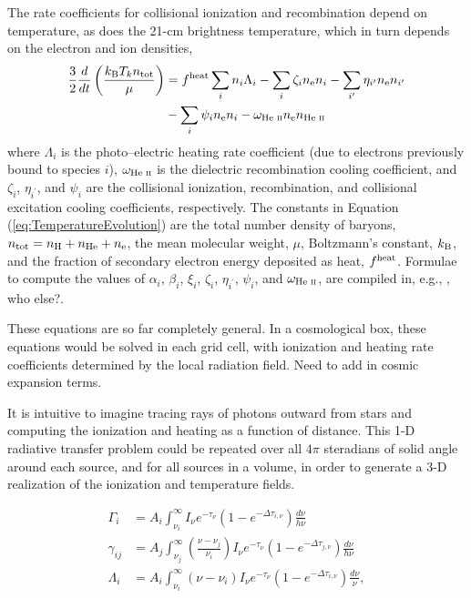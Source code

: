 The rate coefficients for collisional ionization and recombination depend on temperature, as does the 21-cm brightness temperature, which in turn depends on the electron and ion densities, 
\begin{align}
    \frac{3}{2}\frac{d}{dt}\left(\frac{k_{\text{B}} T_k n_{\text{tot}}}{\mu}\right) & = f^{\text{heat}}  \sum_i n_i \Lambda_i - \sum_i \zeta_i n_{\text{e}} n_i - \sum_{i^{\prime}} \eta_{i^{\prime}} n_{\text{e}} n_{i^{\prime}} \nonumber \\ & - \sum_i \psi_i n_{\text{e}} n_i - \omega_{\text{He } \textsc{ii}} n_{\text{e}} n_{\text{He } \textsc{ii}} \label{eq:TemperatureEvolution} 
\end{align}
where $\Lambda_i$ is the photo--electric heating rate coefficient (due to
electrons previously bound to species $i$), $\omega_{\text{He } \textsc{ii}}$ is the dielectric
recombination cooling coefficient, and $\zeta_i$, $\eta_{i^{\prime}}$, and
$\psi_i$ are the collisional ionization, recombination, and collisional
excitation cooling coefficients, respectively. The constants in Equation
(\ref{eq:TemperatureEvolution}) are the total number density of baryons,
$n_{\text{tot}} = n_\mathrm{H} + n_{\mathrm{He}} + n_{\text{e}}$, the mean molecular weight,
$\mu$, Boltzmann's constant, $k_{\text{B}}$, and the fraction of secondary electron
energy deposited as heat, $f^{\text{heat}}$. Formulae to compute the values of $\alpha_i$, $\beta_i$, $\xi_i$,
$\zeta_i$, $\eta_{i^{\prime}}$, $\psi_i$, and $\omega_{\text{He } \textsc{ii}}$, are compiled in, e.g., \cite{Fukugita1994}, {\color{red} who else?}.

These equations are so far completely general. In a cosmological box, these equations would be solved in each grid cell, with ionization and heating rate coefficients determined by the local radiation field. {\color{red} Need to add in cosmic expansion terms.}

It is intuitive to imagine tracing rays of photons outward from stars and computing the ionization and heating as a function of distance. This 1-D radiative transfer problem could be repeated over all $4\pi$ steradians of solid angle around each source, and for all sources in a volume, in order to generate a 3-D realization of the ionization and temperature fields. 

\begin{align}
    \Gamma_i & = A_i \int_{\nu_i}^{\infty} I_{\nu} e^{-\tau_{\nu}} \left(1 - e^{-\Delta \tau_{i,\nu}}\right) \frac{d\nu}{h\nu} \label{eq:PhotoIonizationRate} \\
    \gamma_{ij} & = A_j \int_{\nu_j}^{\infty} \left(\frac{\nu - \nu_j}{\nu_i}\right) I_{\nu} e^{-\tau_{\nu}} \left(1 - e^{-\Delta \tau_{j,\nu}}\right) \frac{d\nu}{h\nu} \label{eq:SecondaryIonizationRate} \\
    \Lambda_i & = A_i \int_{\nu_i}^{\infty} (\nu - \nu_i) I_{\nu} e^{-\tau_{\nu}} \left(1 - e^{-\Delta \tau_{i,\nu}}\right) \frac{d\nu}{\nu} , \label{eq:HeatingRate}
\end{align}

